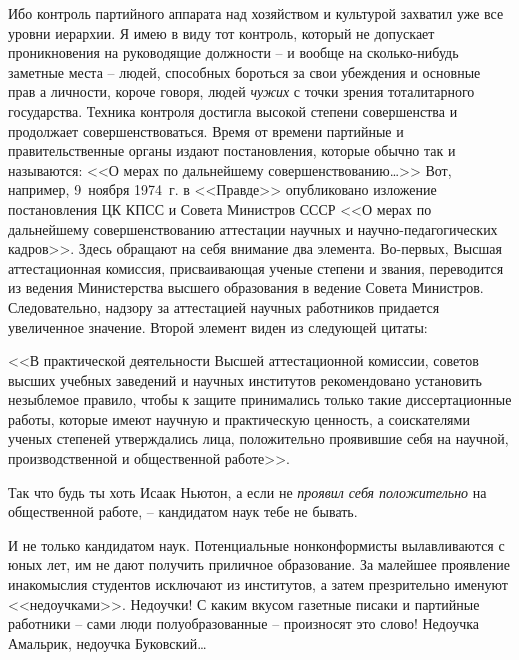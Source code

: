 \documentclass{book}
\begin{document}
Ибо контроль партийного аппарата над хозяйством и культурой захватил уже все уровни иерархии. Я имею в виду тот контроль, который не допускает проникновения на руководящие должности -- и вообще на сколько-нибудь заметные места -- людей, способных бороться за свои убеждения и основные прав а личности, короче говоря, людей \textit{чужих} с  точки зрения тоталитарного государства. Техника контроля достигла высокой степени совершенства и продолжает совершенствоваться. Время от времени партийные и правительственные органы издают постановления, которые обычно так и называются: <<О мерах по дальнейшему совершенствованию\ldots>> Вот, например, 9~ноября 1974~г. в <<Правде>> опубликовано изложение постановления ЦК КПСС и Совета Министров СССР <<О мерах по дальнейшему совершенствованию аттестации научных и научно-педагогических кадров>>. Здесь обращают на себя внимание два элемента. Во-первых, Высшая аттестационная комиссия, присваивающая ученые степени и звания, переводится из ведения Министерства высшего образования в ведение 
Совета Министров. Следовательно, надзору за аттестацией научных работников придается увеличенное значение. Второй элемент виден из следующей цитаты:

<<В практической деятельности Высшей аттестационной комиссии, советов высших учебных заведений и научных институтов рекомендовано установить незыблемое правило, чтобы к защите принимались только такие диссертационные работы, которые имеют научную и практическую ценность, а соискате­лями ученых степеней утверждались лица, положительно проявившие себя на научной, производственной и общественной работе>>.

Так что будь ты хоть Исаак Ньютон, а если не \textit{проявил себя положительно} на общественной работе, -- кандидатом наук тебе не бывать.

И не только кандидатом наук. Потенциальные нонконформисты вылавливаются с юных лет, им не дают получить приличное образование. За малейшее проявление инакомыслия студентов исключают из институтов, а затем презрительно именуют <<недоучками>>. Недоучки! С каким вкусом газетные писаки и партийные работники -- сами люди полуобразованные -- произносят это слово! Недоучка Амальрик, недоучка Буковский\ldots
\end{document}
